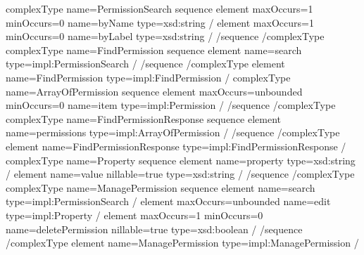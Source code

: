 \documentclass[letterpaper,10pt,english]{sphinxmanual}
\begin{document}
\begin{sphinxVerbatim}[commandchars=\\\{\}]
\PYGZlt{}complexType name=\PYGZdq{}PermissionSearch\PYGZdq{}\PYGZgt{}
\PYGZlt{}sequence\PYGZgt{}
\PYGZlt{}element maxOccurs=\PYGZdq{}1\PYGZdq{} minOccurs=\PYGZdq{}0\PYGZdq{} name=\PYGZdq{}byName\PYGZdq{} type=\PYGZdq{}xsd:string\PYGZdq{} /\PYGZgt{}
\PYGZlt{}element maxOccurs=\PYGZdq{}1\PYGZdq{} minOccurs=\PYGZdq{}0\PYGZdq{} name=\PYGZdq{}byLabel\PYGZdq{} type=\PYGZdq{}xsd:string\PYGZdq{} /\PYGZgt{}
\PYGZlt{}/sequence\PYGZgt{}
\PYGZlt{}/complexType\PYGZgt{}
\PYGZlt{}complexType name=\PYGZdq{}FindPermission\PYGZdq{}\PYGZgt{}
\PYGZlt{}sequence\PYGZgt{}
\PYGZlt{}element name=\PYGZdq{}search\PYGZdq{} type=\PYGZdq{}impl:PermissionSearch\PYGZdq{} /\PYGZgt{}
\PYGZlt{}/sequence\PYGZgt{}
\PYGZlt{}/complexType\PYGZgt{}
\PYGZlt{}element name=\PYGZdq{}FindPermission\PYGZdq{} type=\PYGZdq{}impl:FindPermission\PYGZdq{} /\PYGZgt{}
\PYGZlt{}complexType name=\PYGZdq{}ArrayOfPermission\PYGZdq{}\PYGZgt{}
\PYGZlt{}sequence\PYGZgt{}
\PYGZlt{}element maxOccurs=\PYGZdq{}unbounded\PYGZdq{} minOccurs=\PYGZdq{}0\PYGZdq{} name=\PYGZdq{}item\PYGZdq{} type=\PYGZdq{}impl:Permission\PYGZdq{} /\PYGZgt{}
\PYGZlt{}/sequence\PYGZgt{}
\PYGZlt{}/complexType\PYGZgt{}
\PYGZlt{}complexType name=\PYGZdq{}FindPermissionResponse\PYGZdq{}\PYGZgt{}
\PYGZlt{}sequence\PYGZgt{}
\PYGZlt{}element name=\PYGZdq{}permissions\PYGZdq{} type=\PYGZdq{}impl:ArrayOfPermission\PYGZdq{} /\PYGZgt{}
\PYGZlt{}/sequence\PYGZgt{}
\PYGZlt{}/complexType\PYGZgt{}
\PYGZlt{}element name=\PYGZdq{}FindPermissionResponse\PYGZdq{} type=\PYGZdq{}impl:FindPermissionResponse\PYGZdq{} /\PYGZgt{}
\PYGZlt{}complexType name=\PYGZdq{}Property\PYGZdq{}\PYGZgt{}
\PYGZlt{}sequence\PYGZgt{}
\PYGZlt{}element name=\PYGZdq{}property\PYGZdq{} type=\PYGZdq{}xsd:string\PYGZdq{} /\PYGZgt{}
\PYGZlt{}element name=\PYGZdq{}value\PYGZdq{} nillable=\PYGZdq{}true\PYGZdq{} type=\PYGZdq{}xsd:string\PYGZdq{} /\PYGZgt{}
\PYGZlt{}/sequence\PYGZgt{}
\PYGZlt{}/complexType\PYGZgt{}
\PYGZlt{}complexType name=\PYGZdq{}ManagePermission\PYGZdq{}\PYGZgt{}
\PYGZlt{}sequence\PYGZgt{}
\PYGZlt{}element name=\PYGZdq{}search\PYGZdq{} type=\PYGZdq{}impl:PermissionSearch\PYGZdq{} /\PYGZgt{}
\PYGZlt{}element maxOccurs=\PYGZdq{}unbounded\PYGZdq{} name=\PYGZdq{}edit\PYGZdq{} type=\PYGZdq{}impl:Property\PYGZdq{} /\PYGZgt{}
\PYGZlt{}element maxOccurs=\PYGZdq{}1\PYGZdq{} minOccurs=\PYGZdq{}0\PYGZdq{} name=\PYGZdq{}deletePermission\PYGZdq{} nillable=\PYGZdq{}true\PYGZdq{} type=\PYGZdq{}xsd:boolean\PYGZdq{} /\PYGZgt{}
\PYGZlt{}/sequence\PYGZgt{}
\PYGZlt{}/complexType\PYGZgt{}
\PYGZlt{}element name=\PYGZdq{}ManagePermission\PYGZdq{} type=\PYGZdq{}impl:ManagePermission\PYGZdq{} /\PYGZgt{}

\end{sphinxVerbatim}
\end{document}
